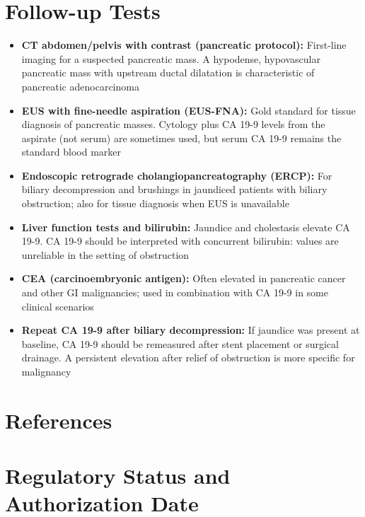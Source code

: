 \section*{Follow-up Tests}
\begin{itemize}
  \item \textbf{CT abdomen/pelvis with contrast (pancreatic protocol):} First-line imaging for a suspected pancreatic mass. A hypodense, hypovascular pancreatic mass with upstream ductal dilatation is characteristic of pancreatic adenocarcinoma
  \item \textbf{EUS with fine-needle aspiration (EUS-FNA):} Gold standard for tissue diagnosis of pancreatic masses. Cytology plus CA 19-9 levels from the aspirate (not serum) are sometimes used, but serum CA 19-9 remains the standard blood marker
  \item \textbf{Endoscopic retrograde cholangiopancreatography (ERCP):} For biliary decompression and brushings in jaundiced patients with biliary obstruction; also for tissue diagnosis when EUS is unavailable
  \item \textbf{Liver function tests and bilirubin:} Jaundice and cholestasis elevate CA 19-9. CA 19-9 should be interpreted with concurrent bilirubin: values are unreliable in the setting of obstruction
  \item \textbf{CEA (carcinoembryonic antigen):} Often elevated in pancreatic cancer and other GI malignancies; used in combination with CA 19-9 in some clinical scenarios
  \item \textbf{Repeat CA 19-9 after biliary decompression:} If jaundice was present at baseline, CA 19-9 should be remeasured after stent placement or surgical drainage. A persistent elevation after relief of obstruction is more specific for malignancy
\end{itemize}

\section*{References}



\clearpage
\section*{Regulatory Status and Authorization Date}

\clearpage
